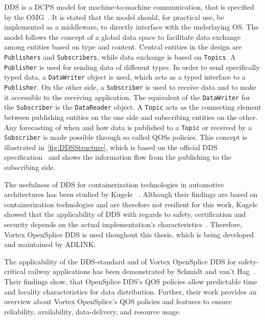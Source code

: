 \Gls*{DDS} is a \gls*{DCPS} model for machine-to-machine communication, that is specified by the \gls*{OMG}~\cite{omgDDSspec}.
It is stated that the model should, for practical use, be implemented as a middleware, to directly interface with the underlaying \gls*{OS}.
The model follows the concept of a global data space to facilitate data exchange among entities based on type and content.
Central entities in the design are \texttt{Publishers} and \texttt{Subscribers}, while data exchange is based on \texttt{Topics}.
A \texttt{Publisher} is used for sending data of different types.
In order to send specifically typed data, a \texttt{DataWriter} object is used, which acts as a typed interface to a \texttt{Publisher}.
On the other side, a \texttt{Subscriber} is used to receive data and to make it accessible to the receiving application.
The equivalent of the \texttt{DataWriter} for the \texttt{Subscriber} is the \texttt{DataReader} object.
A \texttt{Topic} acts as the connecting element between publishing entities on the one side and subscribing entities on the other.
Any forecasting of when and how data is published to a \texttt{Topic} or received by a \texttt{Subscriber} is made possible through so called \glspl*{QOS} policies.
This concept is illustrated in~\autoref{fig:DDSStructure}, which is based on the official \gls*{DDS} specification~\cite{omgDDSspec} and shows the information flow from the publishing to the subscribing side.

The usefulness of \gls*{DDS} for containerization technologies in automotive architectures has been studied by Kugele \etal~\cite{KugeleDataCentricForAuto}.
Although their findings are based on containerization technologies and are therefore not resilient for this work, Kugele \etal showed that the applicability of \gls*{DDS} with regards to safety, certification and security depends on the actual implementation's characteristics~\cite{KugeleDataCentricForAuto}.
Therefore, Vortex OpenSplice DDS is used thoughout this thesis, which is being developed and maintained by ADLINK.

The applicability of the \gls*{DDS}-standard and of Vortex OpenSplice \gls*{DDS} for safety-critical railway applications has been demonstrated by Schmidt and van't Hag~\cite{SchmidtMissionCriticalChallenges}.
Their findings show, that OpenSplice \gls*{DDS}'s \gls*{QOS} policies allow predictable time and locality characteristics for data distribution.
Further, their work provides an overview about Vortex OpenSplice's \gls*{QOS} policies and features to ensure reliability, availability, data-delivery, and resource usage.


